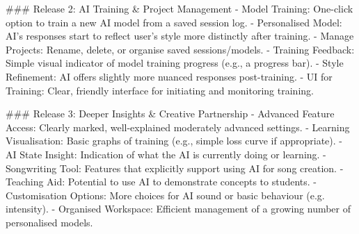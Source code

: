 ###  Release 2: AI Training & Project Management
- Model Training: One-click option to train a new AI model from a saved session log.
- Personalised Model: AI's responses start to reflect user's style more distinctly after training.
- Manage Projects: Rename, delete, or organise saved sessions/models.
- Training Feedback: Simple visual indicator of model training progress (e.g., a progress bar).
- Style Refinement: AI offers slightly more nuanced responses post-training.
- UI for Training: Clear, friendly interface for initiating and monitoring training.

###  Release 3: Deeper Insights & Creative Partnership
- Advanced Feature Access: Clearly marked, well-explained moderately advanced settings.
- Learning Visualisation: Basic graphs of training (e.g., simple loss curve if appropriate).
- AI State Insight: Indication of what the AI is currently doing or learning.
- Songwriting Tool: Features that explicitly support using AI for song creation.
- Teaching Aid: Potential to use AI to demonstrate concepts to students.
- Customisation Options: More choices for AI sound or basic behaviour (e.g. intensity).
- Organised Workspace: Efficient management of a growing number of personalised models. 